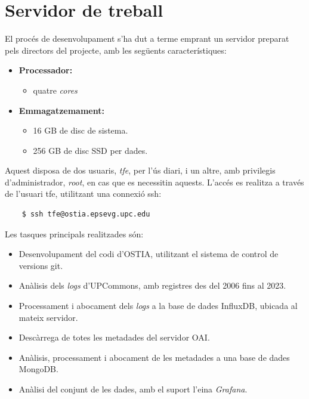 \chapter{Servidor de treball}\label{ch:server-description}

El procés de desenvolupament s’ha dut a terme emprant un servidor preparat pels directors del projecte, amb les següents característiques:

\begin{itemize}
    \item \textbf{Processador:}
    \begin{itemize}
        \item quatre \textit{cores}
    \end{itemize}
    \item \textbf{Emmagatzemament:}
    \begin{itemize}
        \item 16 GB de disc de sistema.
        \item 256 GB de disc SSD per dades.
    \end{itemize}
\end{itemize}

\noindent
Aquest disposa de dos usuaris, \textit{tfe}, per l’ús diari, i un altre, amb privilegis d’administrador, \textit{root}, en cas que es necessitin aquests.
L’accés es realitza a través de l’usuari tfe, utilitzant una connexió \gls{ssh}:

\begin{verbatim}
    $ ssh tfe@ostia.epsevg.upc.edu
\end{verbatim}

\noindent
Les tasques principals realitzades són:

\begin{itemize}
    \item Desenvolupament del codi d’\gls{OSTIA}, utilitzant el sistema de control de versions git.
    \item Anàlisis dels \textit{\gls{log}s} d’\gls{UPCommons}, amb registres des del 2006 fins al 2023.
    \item Processament i abocament dels \textit{\gls{log}s} a la base de dades InfluxDB, ubicada al mateix servidor.
    \item Descàrrega de totes les metadades del servidor \gls{OAI}.
    \item Anàlisis, processament i abocament de les metadades a una base de dades MongoDB.
    \item Anàlisi del conjunt de les dades, amb el suport l’eina \textit{Grafana}.
\end{itemize}

